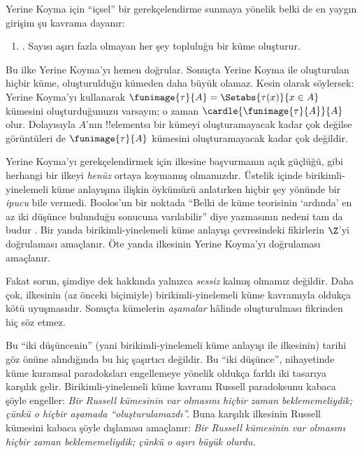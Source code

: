 \documentclass[../../../include/open-logic-section]{subfiles}
\begin{document}

Yerine Koyma için ``içsel'' bir gerekçelendirme sunmaya yönelik belki de en
yaygın girişim şu kavrama dayanır:
\begin{enumerate}
	\item[] \limofsize. Sayısı aşırı fazla olmayan her şey topluluğu bir küme
	oluşturur.
\end{enumerate}
Bu ilke Yerine Koyma'yı hemen doğrular. Sonuçta Yerine Koyma ile oluşturulan
hiçbir küme, oluşturulduğu kümeden daha büyük olamaz. Kesin olarak söylersek:
Yerine Koyma'yı kullanarak $\funimage{\tau}{A} =
\Setabs{\tau(x)}{x \in A}$ kümesini oluşturduğunuzu varsayın; o zaman
$\cardle{\funimage{\tau}{A}}{A}$ olur. Dolayısıyla $A$'nın !!{element}s{}ı bir
kümeyi oluşturamayacak kadar çok değilse görüntüleri de
$\funimage{\tau}{A}$ kümesini oluşturamayacak kadar çok değildir.

Yerine Koyma'yı gerekçelendirmek için \limofsize{} ilkesine başvurmanın açık
güçlüğü, \limofsize{} gibi herhangi bir ilkeyi \emph{henüz} ortaya koymamış
olmamızdır. Üstelik  içinde
birikimli-yinelemeli küme anlayışına ilişkin öykümüzü anlatırken hiçbir şey
\limofsize{} yönünde bir \emph{ipucu} bile vermedi. Boolos'un bir noktada
``Belki de küme teorisinin `ardında' en az iki düşünce bulunduğu sonucuna
varılabilir'' diye yazmasının nedeni tam da budur
\citeyearpar[p.~19]{Boolos1989}. Bir yanda birikimli-yinelemeli küme anlayışı
çevresindeki fikirlerin $\Z$'yi doğrulaması amaçlanır. Öte yanda
\limofsize{} ilkesinin Yerine Koyma'yı doğrulaması amaçlanır.

Fakat sorun, şimdiye dek \limofsize{} hakkında yalnızca \emph{sessiz}
kalmış olmamız değildir. Daha çok, \limofsize{} ilkesinin (az önceki
biçimiyle) birikimli-yinelemeli küme kavramıyla oldukça kötü uyuşmasıdır.
Sonuçta kümelerin \emph{aşamalar} hâlinde oluşturulması fikrinden hiç söz
etmez.

Bu ``iki düşüncenin'' (yani birikimli-yinelemeli küme anlayışı ile
\limofsize{} ilkesinin) tarihi göz önüne alındığında bu hiç şaşırtıcı
değildir. Bu ``iki düşünce'', nihayetinde küme kuramsal paradoksları engellemeye
yönelik oldukça farklı iki tasarıya karşılık gelir. Birikimli-yinelemeli küme
kavramı Russell paradoksunu kabaca şöyle engeller: \emph{Bir Russell
kümesinin var olmasını hiçbir zaman beklememeliydik; çünkü o hiçbir aşamada
``oluşturulamazdı''.} Buna karşılık \limofsize{} ilkesinin Russell kümesini
kabaca şöyle dışlaması amaçlanır: \emph{Bir Russell kümesinin var olmasını
hiçbir zaman beklememeliydik; çünkü o aşırı büyük olurdu.}
\end{document}
